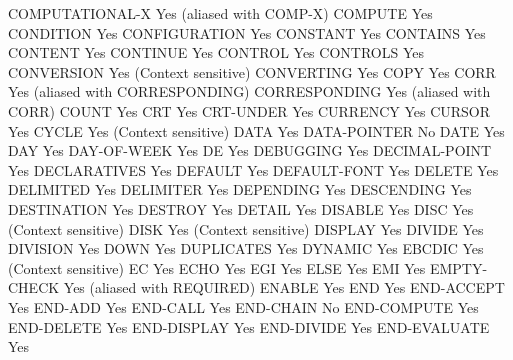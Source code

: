 COMPUTATIONAL-X                 Yes (aliased with COMP-X)
COMPUTE                         Yes
CONDITION                       Yes
CONFIGURATION                   Yes
CONSTANT                        Yes
CONTAINS                        Yes
CONTENT                         Yes
CONTINUE                        Yes
CONTROL                         Yes
CONTROLS                        Yes
CONVERSION                      Yes (Context sensitive)
CONVERTING                      Yes
COPY                            Yes
CORR                            Yes (aliased with CORRESPONDING)
CORRESPONDING                   Yes (aliased with CORR)
COUNT                           Yes
CRT                             Yes
CRT-UNDER                       Yes
CURRENCY                        Yes
CURSOR                          Yes
CYCLE                           Yes (Context sensitive)
DATA                            Yes
DATA-POINTER                    No
DATE                            Yes
DAY                             Yes
DAY-OF-WEEK                     Yes
DE                              Yes
DEBUGGING                       Yes
DECIMAL-POINT                   Yes
DECLARATIVES                    Yes
DEFAULT                         Yes
DEFAULT-FONT                    Yes
DELETE                          Yes
DELIMITED                       Yes
DELIMITER                       Yes
DEPENDING                       Yes
DESCENDING                      Yes
DESTINATION                     Yes
DESTROY                         Yes
DETAIL                          Yes
DISABLE                         Yes
DISC                            Yes (Context sensitive)
DISK                            Yes (Context sensitive)
DISPLAY                         Yes
DIVIDE                          Yes
DIVISION                        Yes
DOWN                            Yes
DUPLICATES                      Yes
DYNAMIC                         Yes
EBCDIC                          Yes (Context sensitive)
EC                              Yes
ECHO                            Yes
EGI                             Yes
ELSE                            Yes
EMI                             Yes
EMPTY-CHECK                     Yes (aliased with REQUIRED)
ENABLE                          Yes
END                             Yes
END-ACCEPT                      Yes
END-ADD                         Yes
END-CALL                        Yes
END-CHAIN                       No
END-COMPUTE                     Yes
END-DELETE                      Yes
END-DISPLAY                     Yes
END-DIVIDE                      Yes
END-EVALUATE                    Yes
